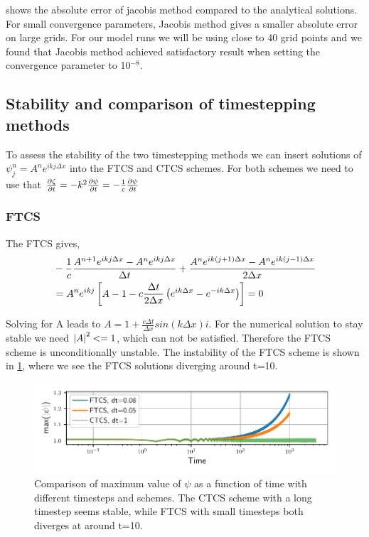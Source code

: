 shows the absolute error of jacobis method compared to the analytical solutions.
For small convergence parameters, Jacobis method gives a smaller
absolute error on large grids.
For our model runs we will be using close to 40 grid points and we found that
Jacobis method achieved satisfactory result when setting the convergence
parameter to 10$^{-8}$.

\subsection{Stability and comparison of timestepping methods}

To assess the stability of the two timestepping methods we can insert solutions
of $\psi_{j}^{n} = A^n e^{ikj \Delta x}$ into the FTCS and CTCS schemes.
For both schemes we need to use that
$\pdv{\zeta}{t} = -k^2 \pdv{\psi}{t} = - \frac{1}{c} \pdv{\psi}{t}$

\subsubsection{FTCS}
The FTCS gives,
\begin{align}
  &-\frac{1}{c} \frac{A^{n+1} e^{ikj\Delta x} - A^n e^{ikj\Delta x}}{\Delta t} + \frac{A^n e^{ik(j+1)\Delta x} - A^n e^{ik(j-1)\Delta x}}{2\Delta x} \\
  &= A^n e^{ikj} \left[A - 1 - c\frac{\Delta t}{2 \Delta x} \left(e^{ik\Delta x} - e^{-ik\Delta x}\right)\right] = 0
\end{align}

Solving for A leads to $ A = 1 + \frac{c \Delta t}{\Delta x} sin(k\Delta x) i$.
For the numerical solution to stay stable we need $\abs{A}^2 <= 1$, which can
not be satisfied. Therefore the FTCS scheme is unconditionally unstable.
The instability of the FTCS scheme is shown in \cref{fig:compare_small},
where we see the FTCS solutions diverging around t=10.

\begin{figure}[h]
  \centering
  \includegraphics[width=\textwidth]{../figures/stability_compare.pdf}
  \caption{Comparison of maximum value of $\psi$ as a function of time with
  different timesteps and schemes.
  The CTCS scheme with a long timestep seems stable, while FTCS with small timesteps
  both diverges at around t=10.}
  \label{fig:compare_small}
\end{figure}



